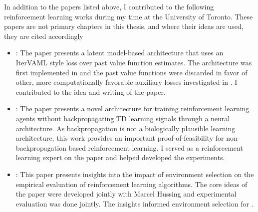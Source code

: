 In addition to the papers listed above, I contributed to the following reinforcement learning works during my time at the University of Toronto. These papers are not primary chapters in this thesis, and where their ideas are used, they are cited accordingly
\begin{itemize}
	\item {}: The paper presents a latent model-based architecture that uses an IterVAML \parencite{itervaml} style loss over past value function estimates. The architecture was first implemented in \textcite{voelcker2023lambda,voelcker2025mad,voelcker2025calibrated} and the past value functions were discarded in favor of other, more computationally favorable auxiliary losses investigated in \textcite{voelcker2024when}.
	I contributed to the idea and writing of the paper.
	\item {}: The paper presents a novel architecture for training reinforcement learning agents without backpropagating TD learning signals through a neural architecture.
	As backpropagation is not a biologically plausible learning architecture, this work provides an important proof-of-feasibility for non-backpropagation based reinforcement learning.
    I served as a reinforcement learning expert on the paper and helped developed the experiments.
	\item {}: This paper presents insights into the impact of environment selection on the empirical evaluation of reinforcement learning algorithms.
	The core ideas of the paper were developed jointly with Marcel Hussing and experimental evaluation was done jointly.
    The insights informed environment selection for \textcite{voelcker2025mad}.
\end{itemize}
